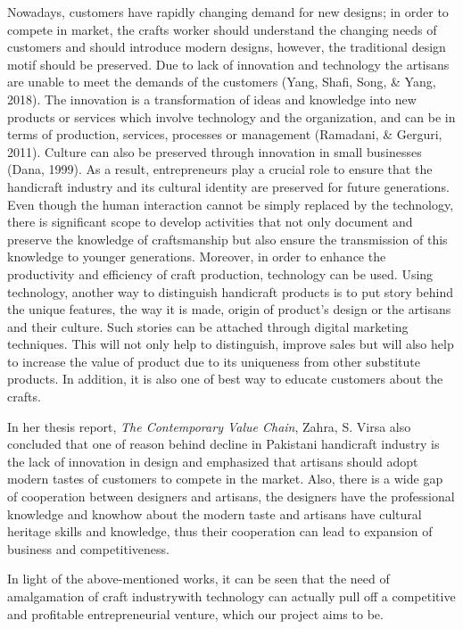 Nowadays, customers have rapidly changing demand for new designs; in order to compete in market, the crafts worker should understand the changing needs of customers and should introduce modern designs, however, the traditional design motif should be preserved. Due to lack of innovation and technology the artisans are unable to meet the demands of the customers (Yang, Shafi, Song, \& Yang, 2018). The innovation is a transformation of ideas and knowledge into new products or services which involve technology and the organization, and can be in terms of production, services, processes or management (Ramadani, \& Gerguri, 2011). Culture can also be preserved through innovation in small businesses (Dana, 1999). As a result, entrepreneurs play a crucial role to ensure that the handicraft industry and its cultural identity are preserved for future generations. Even though the human interaction cannot be simply replaced by the technology, there is significant scope to develop activities that not only document and preserve the knowledge of craftsmanship but also ensure the transmission of this knowledge to younger generations. Moreover, in order to enhance the productivity and efficiency of craft production, technology can be used. Using technology, another way to distinguish handicraft products is to put story behind the unique features, the way it is made, origin of product’s design or the artisans and their culture. Such stories can be attached through digital marketing techniques. This will not only help to distinguish, improve sales but will also help to increase the value of product due to its uniqueness from other substitute products. In addition, it is also one of best way to educate customers about the crafts.

In her thesis report, \textit {The Contemporary Value Chain}, Zahra, S. Virsa also concluded that one of reason behind decline in Pakistani handicraft industry is the lack of innovation in design and emphasized that artisans should adopt modern tastes of customers to compete in the market. Also, there is a wide gap of cooperation between designers and artisans, the designers have the professional knowledge and knowhow about the modern taste and artisans have cultural heritage skills and knowledge, thus their cooperation can lead to expansion of business and competitiveness.

In light of the above-mentioned works, it can be seen that the need of amalgamation of craft industrywith technology can actually pull off a competitive and profitable entrepreneurial venture, which our project aims to be.




